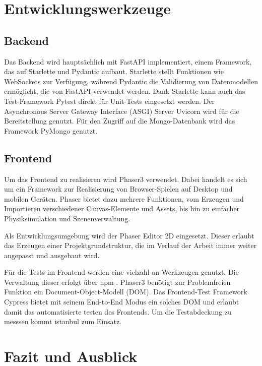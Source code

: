 \documentclass[a4paper, 10pt, conference]{IEEEtran}
\begin{document}
\section{Entwicklungswerkzeuge}\label{sec:entwicklungswerkzeuge}



\subsection{Backend}\label{subsec:backend-dev-tools}
Das Backend wird hauptsächlich mit FastAPI implementiert, einem Framework, das auf Starlette \cite{starlette} und Pydantic \cite{pydantic} aufbaut. Starlette stellt Funktionen wie WebSockets zur Verfügung, während Pydantic die Validierung von Datenmodellen ermöglicht, die von FastAPI verwendet werden. Dank Starlette kann auch das Test-Framework Pytest \cite{pytest} direkt für Unit-Tests eingesetzt werden. Der Asynchronous Server Gateway Interface (ASGI) Server Uvicorn \cite{uvicorn} wird für die Bereitstellung genutzt.
Für den Zugriff auf die Mongo-Datenbank wird das Framework PyMongo genutzt. 




\subsection{Frontend}\label{subsec:frontend-dev-tools}

Um das Frontend zu realisieren wird Phaser3 verwendet. Dabei handelt es sich um ein Framework zur Realisierung von Browser-Spielen auf Desktop und mobilen Geräten. Phaser bietet dazu mehrere Funktionen, vom Erzeugen und Importieren verschiedener Canvas-Elemente und Assets, bis hin zu einfacher Physiksimulation und Szenenverwaltung.

Als Entwicklungsumgebung wird der Phaser Editor 2D eingesetzt. Dieser erlaubt das Erzeugen einer Projektgrundstruktur, die im Verlauf der Arbeit immer weiter angepasst und ausgebaut wird.  

Für die Tests im Frontend werden eine vielzahl an Werkzeugen genutzt. Die Verwaltung dieser erfolgt über npm \cite{npm}. Phaser3 benötigt zur Problemfreien Funktion ein Document-Object-Modell (DOM). Das Frontend-Test Framework Cypress \cite{cypress} bietet mit seinem End-to-End Modus ein solches DOM und erlaubt damit das automatisierte testen des Frontends. Um die Testabdeckung zu messsen kommt istanbul \cite{istanbul} zum Einsatz.



\section{Fazit und Ausblick}\label{sec:fazit}




\printbibliography
\end{document}
